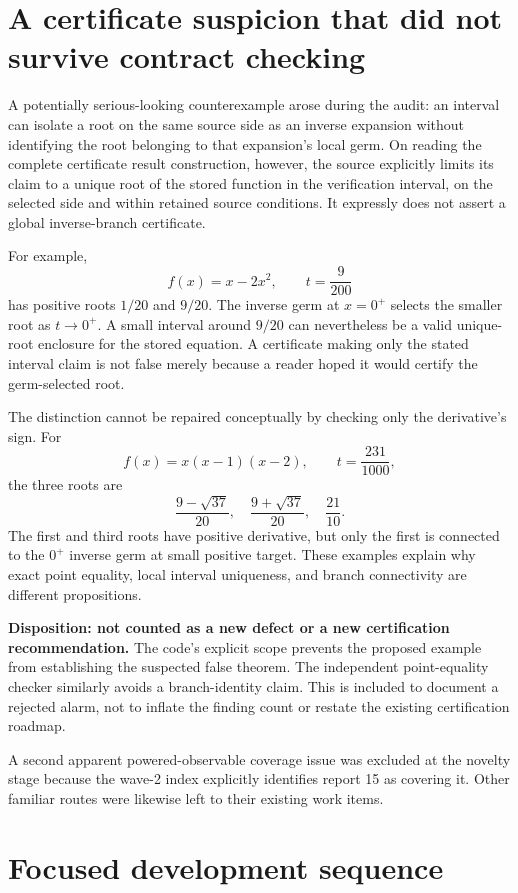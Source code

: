 \documentclass[11pt,letterpaper]{article}
\begin{document}
\section{A certificate suspicion that did not survive contract checking}

A potentially serious-looking counterexample arose during the audit: an interval can isolate a root on the same source side as an inverse expansion without identifying the root belonging to that expansion's local germ. On reading the complete certificate result construction, however, the source explicitly limits its claim to a unique root of the stored function in the verification interval, on the selected side and within retained source conditions. It expressly does not assert a global inverse-branch certificate.\cite{certificates}

For example,
\[
 f(x)=x-2x^2,\qquad t=\frac9{200}
\]
has positive roots $1/20$ and $9/20$. The inverse germ at $x=0^+$ selects the smaller root as $t\to0^+$. A small interval around $9/20$ can nevertheless be a valid unique-root enclosure for the stored equation. A certificate making only the stated interval claim is not false merely because a reader hoped it would certify the germ-selected root.

The distinction cannot be repaired conceptually by checking only the derivative's sign. For
\[
 f(x)=x(x-1)(x-2),\qquad t=\frac{231}{1000},
\]
the three roots are
\[
 \frac{9-\sqrt{37}}{20},\quad
 \frac{9+\sqrt{37}}{20},\quad
 \frac{21}{10}.
\]
The first and third roots have positive derivative, but only the first is connected to the $0^+$ inverse germ at small positive target. These examples explain why exact point equality, local interval uniqueness, and branch connectivity are different propositions.

\textbf{Disposition: not counted as a new defect or a new certification recommendation.} The code's explicit scope prevents the proposed example from establishing the suspected false theorem. The independent point-equality checker similarly avoids a branch-identity claim. This is included to document a rejected alarm, not to inflate the finding count or restate the existing certification roadmap.

A second apparent powered-observable coverage issue was excluded at the novelty stage because the wave-2 index explicitly identifies report 15 as covering it. Other familiar routes were likewise left to their existing work items.\cite{wave2-index}

\section{Focused development sequence}
\end{document}
